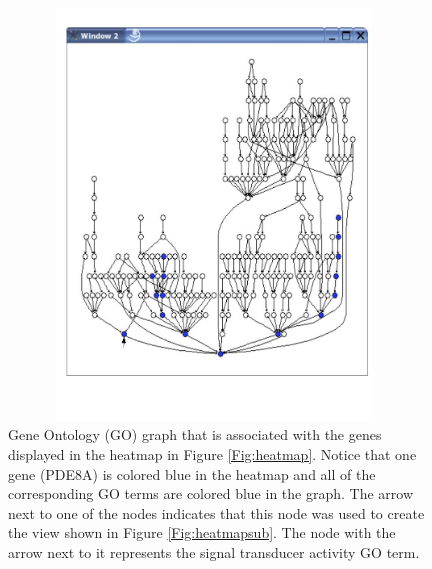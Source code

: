 \documentclass{article}[11pt]
\begin{document}
\begin{figure}[ht]
  \begin{center}
    \includegraphics[height=4.3in, width=4.3in]{GOgraph2.jpg}
    \caption{ Gene Ontology (GO) graph that is associated with the genes
      displayed in the heatmap in Figure \ref{Fig:heatmap}.  Notice that one
      gene (PDE8A) is colored blue in the heatmap and all of the corresponding
      GO terms are colored blue in the graph.  The arrow next to one of the
      nodes indicates that this node was used to create the view shown in
      Figure \ref{Fig:heatmapsub}.  The node with the arrow next to it
      represents the signal transducer activity GO term. }
    \label{Fig:GOgraph}
  \end{center}
\end{figure}
\end{document}
